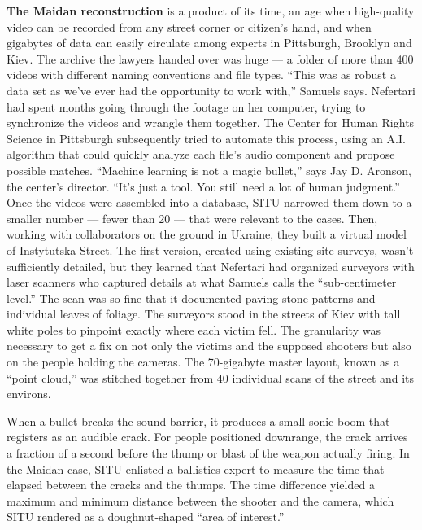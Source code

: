 \textbf{The Maidan reconstruction} is a product of its time, an age when
high-quality video can be recorded from any street corner or citizen's
hand, and when gigabytes of data can easily circulate among experts in
Pittsburgh, Brooklyn and Kiev. The archive the lawyers handed over was
huge --- a folder of more than 400 videos with different naming
conventions and file types. ``This was as robust a data set as we've
ever had the opportunity to work with,'' Samuels says. Nefertari had
spent months going through the footage on her computer, trying to
synchronize the videos and wrangle them together. The Center for Human
Rights Science in Pittsburgh subsequently tried to automate this
process, using an A.I. algorithm that could quickly analyze each file's
audio component and propose possible matches. ``Machine learning is not
a magic bullet,'' says Jay D. Aronson, the center's director. ``It's
just a tool. You still need a lot of human judgment.'' Once the videos
were assembled into a database, SITU narrowed them down to a smaller
number --- fewer than 20 --- that were relevant to the cases. Then,
working with collaborators on the ground in Ukraine, they built a
virtual model of Instytutska Street. The first version, created using
existing site surveys, wasn't sufficiently detailed, but they learned
that Nefertari had organized surveyors with laser scanners who captured
details at what Samuels calls the ``sub-centimeter level.'' The scan was
so fine that it documented paving-stone patterns and individual leaves
of foliage. The surveyors stood in the streets of Kiev with tall white
poles to pinpoint exactly where each victim fell. The granularity was
necessary to get a fix on not only the victims and the supposed shooters
but also on the people holding the cameras. The 70-gigabyte master
layout, known as a ``point cloud,'' was stitched together from 40
individual scans of the street and its environs.

When a bullet breaks the sound barrier, it produces a small sonic boom
that registers as an audible crack. For people positioned downrange, the
crack arrives a fraction of a second before the thump or blast of the
weapon actually firing. In the Maidan case, SITU enlisted a ballistics
expert to measure the time that elapsed between the cracks and the
thumps. The time difference yielded a maximum and minimum distance
between the shooter and the camera, which SITU rendered as a
doughnut-shaped ``area of interest.''

